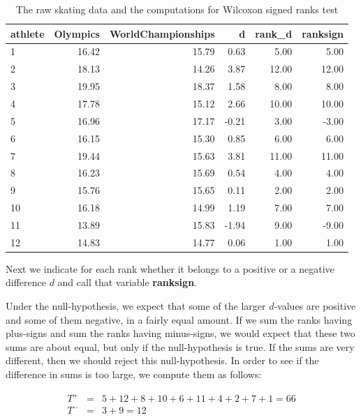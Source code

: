 \documentclass[]{book}\usepackage[]{graphicx}\usepackage[]{color}
\begin{document}
\begin{table}[ht]
\centering
\caption{The raw skating data and the computations for Wilcoxon signed ranks test} 
\label{tab:nonparmixed_77}
\begin{tabular}{lrrrrr}
  \hline
athlete & Olympics & WorldChampionships & d & rank\_d & ranksign \\ 
  \hline
1 & 16.42 & 15.79 & 0.63 & 5.00 & 5.00 \\ 
  2 & 18.13 & 14.26 & 3.87 & 12.00 & 12.00 \\ 
  3 & 19.95 & 18.37 & 1.58 & 8.00 & 8.00 \\ 
  4 & 17.78 & 15.12 & 2.66 & 10.00 & 10.00 \\ 
  5 & 16.96 & 17.17 & -0.21 & 3.00 & -3.00 \\ 
  6 & 16.15 & 15.30 & 0.85 & 6.00 & 6.00 \\ 
  7 & 19.44 & 15.63 & 3.81 & 11.00 & 11.00 \\ 
  8 & 16.23 & 15.69 & 0.54 & 4.00 & 4.00 \\ 
  9 & 15.76 & 15.65 & 0.11 & 2.00 & 2.00 \\ 
  10 & 16.18 & 14.99 & 1.19 & 7.00 & 7.00 \\ 
  11 & 13.89 & 15.83 & -1.94 & 9.00 & -9.00 \\ 
  12 & 14.83 & 14.77 & 0.06 & 1.00 & 1.00 \\ 
   \hline
\end{tabular}
\end{table}


Next we indicate for each rank whether it belongs to a positive or a negative difference $d$ and call that variable \textbf{ranksign}.

Under the null-hypothesis, we expect that some of the larger $d$-values are positive and some of them negative, in a fairly equal amount. If we sum the ranks having plus-signs and sum the ranks having minus-signs, we would expect that these two sums are about equal, but only if the null-hypothesis is true. If the sums are very different, then we should reject this null-hypothesis. In order to see if the difference in sums is too large, we compute them as follows:


\begin{eqnarray}
T^+ &=& 5+ 12 + 8 +10+6+11+4 +2 +7 +1 = 66 \nonumber \\
T^- &=& 3 + 9= 12 \nonumber
\end{eqnarray}
\end{document}
